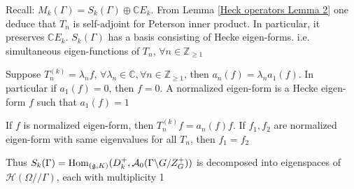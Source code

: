 \documentclass[main]{subfiles}
\begin{document}
Recall: $M_k(\Gamma)=S_k(\Gamma)\oplus\mathbb CE_k$. From Lemma \ref{Heck operators Lemma 2} one deduce that $T_n$ is self-adjoint for Peterson inner product. In particular, it preserves $\mathbb CE_k$. $S_k(\Gamma)$ has a basis consisting of Hecke eigen-forms. i.e. simultaneous eigen-functions of $T_n$, $\forall n\in\mathbb Z_{\geq1}$

\begin{corollary}
Suppose $T_n^{(k)}=\lambda_nf$, $\forall\lambda_n\in\mathbb C,\forall n\in\mathbb Z_{\geq1}$, then $a_n(f)=\lambda_na_1(f)$. In particular if $a_1(f)=0$, then $f=0$. A normalized eigen-form is a Hecke eigen-form $f$ such that $a_1(f)=1$
\end{corollary}

\begin{corollary}
If $f$ is normalized eigen-form, then $T^{(k)}_nf=a_n(f)f$. If $f_1,f_2$ are normalized eigen-form with same eigenvalues for all $T_n$, then $f_1=f_2$
\end{corollary}

Thus $S_k(\Gamma)=\operatorname{Hom}_{(\mathfrak g,K)}(D^+_k,\mathcal A_0(\Gamma\backslash G/Z_G^+))$ is decomposed into eigenspaces of $\mathscr H(\Omega//\Gamma)$, each with multiplicity 1
\end{document}
